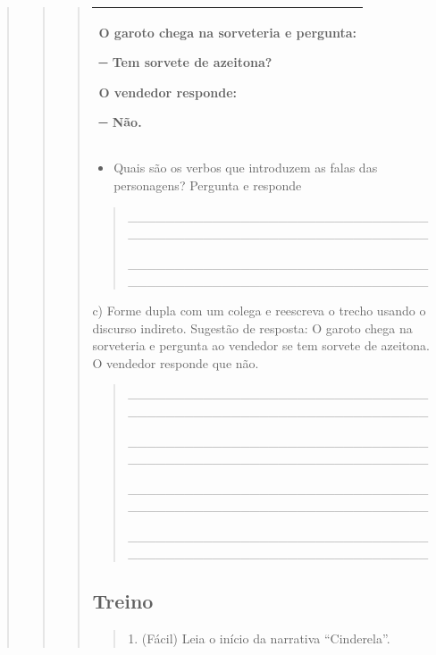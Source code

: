 \begin{quote}
\begin{quote}
\begin{quote}
\begin{longtable}[]{@{}l@{}}
\toprule
\begin{minipage}[t]{0.97\columnwidth}\raggedright\strut
O garoto chega na sorveteria e pergunta:

─ Tem sorvete de azeitona?

O vendedor responde:

─ Não.\strut
\end{minipage}\tabularnewline
\bottomrule
\end{longtable}

\begin{itemize}
\item
  Quais são os verbos que introduzem as falas das personagens? Pergunta
  e responde
\end{itemize}

\begin{quote}
\_\_\_\_\_\_\_\_\_\_\_\_\_\_\_\_\_\_\_\_\_\_\_\_\_\_\_\_\_\_\_\_\_\_\_\_\_\_\_\_\_\_\_\_\_\_\_\_\_\_\_\_\_\_\_\_\_\_\_\_\_\_\_\_

\_\_\_\_\_\_\_\_\_\_\_\_\_\_\_\_\_\_\_\_\_\_\_\_\_\_\_\_\_\_\_\_\_\_\_\_\_\_\_\_\_\_\_\_\_\_\_\_\_\_\_\_\_\_\_\_\_\_\_\_\_\_\_\_
\end{quote}

c) Forme dupla com um colega e reescreva o trecho usando o discurso
indireto. Sugestão de resposta: O garoto chega na sorveteria e pergunta
ao vendedor se tem sorvete de azeitona. O vendedor responde que não.

\begin{quote}
\_\_\_\_\_\_\_\_\_\_\_\_\_\_\_\_\_\_\_\_\_\_\_\_\_\_\_\_\_\_\_\_\_\_\_\_\_\_\_\_\_\_\_\_\_\_\_\_\_\_\_\_\_\_\_\_\_\_\_\_\_\_\_\_

\_\_\_\_\_\_\_\_\_\_\_\_\_\_\_\_\_\_\_\_\_\_\_\_\_\_\_\_\_\_\_\_\_\_\_\_\_\_\_\_\_\_\_\_\_\_\_\_\_\_\_\_\_\_\_\_\_\_\_\_\_\_\_\_

\_\_\_\_\_\_\_\_\_\_\_\_\_\_\_\_\_\_\_\_\_\_\_\_\_\_\_\_\_\_\_\_\_\_\_\_\_\_\_\_\_\_\_\_\_\_\_\_\_\_\_\_\_\_\_\_\_\_\_\_\_\_\_\_

\_\_\_\_\_\_\_\_\_\_\_\_\_\_\_\_\_\_\_\_\_\_\_\_\_\_\_\_\_\_\_\_\_\_\_\_\_\_\_\_\_\_\_\_\_\_\_\_\_\_\_\_\_\_\_\_\_\_\_\_\_\_\_\_
\end{quote}

\subsection{Treino}\label{treino-5}

\begin{quote}
1. (Fácil) Leia o início da narrativa ``Cinderela''.


\end{quote}
\end{quote}
\end{quote}
\end{quote}
